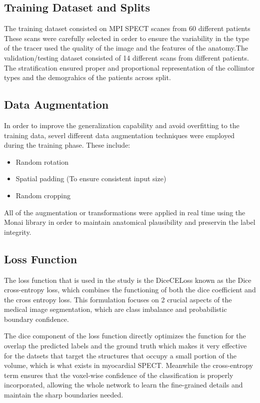 \subsection{Training Dataset and Splits}
The training dataset consisted on MPI SPECT scanes from 60 different patients These scans were carefully selected in order to ensure the variability in the type of the tracer used the quality of the image and the features of the anatomy.The validation/testing dataset consisted of 14 different scans from different patients. The stratification ensured proper and proportional representation of the collimtor types and the demograhics of the patients across split.

\subsection{Data Augmentation}
In order to improve the generalization capability and avoid overfitting to the training data, severl different data augmentation techniques were employed during the training phase. These include: 
\begin{itemize}
\item Random rotation \item Spatial padding (To ensure consistent input size) \item Random cropping 
\end{itemize}

All of the augmentation or transformations were applied in real time using the Monai library in order to maintain anatomical plausibility and preservin the label integrity.

\subsection{Loss Function}
The loss function that is used in the study is the DiceCELoss known as the Dice cross-entropy loss, which combines the functioning of both the dice coefficient and the cross entropy loss. This formulation focuses on 2 crucial aspects of the medical image segmentation, which are class imbalance and probabilistic boundary confidence.

The dice component of the loss function directly optimizes the function for the overlap the predicted labels and the ground truth which makes it very effective for the datsets that target the structures that occupy a small portion of the volume, which is what exists in myocardial SPECT. Meanwhile the cross-entropy term ensures that the voxel-wise confidence of the classification is properly incorporated, allowing the whole network to learn the fine-grained details and maintain the sharp boundaries needed.

